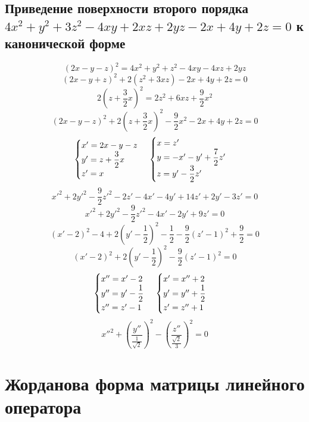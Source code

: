 \documentclass[12pt]{article}
\begin{document}
\subsection{Приведение поверхности второго порядка $4x^2 + y^2 + 3z^2 - 4xy + 2xz + 2yz - 2x + 4y + 2z = 0$ к канонической форме}
\[
    (2x - y - z)^2 = 4x^2 + y^2 + z^2 - 4xy - 4xz + 2yz
\]
\[
    (2x - y + z)^2 + 2(z^2 + 3xz) - 2x + 4y + 2z = 0
\]
\[
    2(z + \dfrac{3}{2}x)^2 = 2z^2 + 6xz + \dfrac{9}{2}x^2
\]
\[
    (2x - y - z)^2 + 2(z + \dfrac{3}{2}x)^2 - \dfrac{9}{2}x^2 - 2x + 4y + 2z = 0
\]
\[
    \begin{cases}
        x' = 2x - y - z        \\
        y' = z + \dfrac{3}{2}x \\
        z' = x
    \end{cases}
    \\
    \begin{cases}
        x = z'                        \\
        y = -x' - y' + \dfrac{7}{2}z' \\
        z = y' - \dfrac{3}{2}z'
    \end{cases}
\]
\[
    {x'}^2 + 2{y'}^2 - \dfrac{9}{2}{z'}^2 - 2z' - 4x' - 4y' + 14z' + 2y' - 3z' = 0
\]
\[
    {x'}^2 + 2{y'}^2 - \dfrac{9}{2}{z'}^2 - 4x' - 2y' + 9z' = 0
\]
\[
    (x' - 2)^2 - 4 + 2\left(y' - \dfrac{1}{2}\right)^2 - \dfrac{1}{2} - \dfrac{9}{2}\left(z' - 1\right)^2 + \dfrac{9}{2} = 0
\]
\[
    (x' - 2)^2 + 2\left(y' - \dfrac{1}{2}\right)^2 - \dfrac{9}{2}\left(z' - 1\right)^2 = 0
\]
\[
    \begin{cases}
        x'' = x' - 2            \\
        y'' = y' - \dfrac{1}{2} \\
        z'' = z' - 1
    \end{cases}
    \\
    \begin{cases}
        x' = x'' + 2            \\
        y' = y'' + \dfrac{1}{2} \\
        z' = z'' + 1
    \end{cases}
\]
\[
    {x''}^2 + \left(\dfrac{y''}{\frac{1}{\sqrt{2}}}\right)^2 - \left(\dfrac{z''}{\frac{\sqrt{2}}{3}}\right)^2 = 0
\]

\section{Жорданова форма матрицы линейного оператора}
\end{document}

